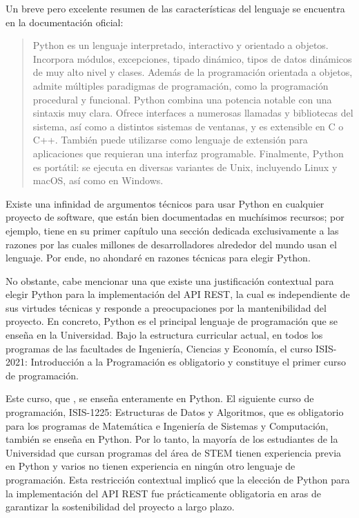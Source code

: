 Un breve pero excelente resumen de las características del lenguaje se encuentra en la documentación oficial:
\begin{quote}
	\gls{Python} es un lenguaje interpretado, interactivo y orientado a objetos. Incorpora módulos, excepciones, tipado dinámico, tipos de datos dinámicos de muy alto nivel y clases. Además de la programación orientada a objetos, admite múltiples paradigmas de programación, como la programación procedural y funcional. \gls{Python} combina una potencia notable con una sintaxis muy clara. Ofrece interfaces a numerosas llamadas y bibliotecas del sistema, así como a distintos sistemas de ventanas, y es extensible en C o C++. También puede utilizarse como lenguaje de extensión para aplicaciones que requieran una interfaz programable. Finalmente, \gls{Python} es portátil: se ejecuta en diversas variantes de Unix, incluyendo Linux y macOS, así como en Windows. \cite{python_official_docs}
\end{quote} %
\noindent Existe una infinidad de argumentos técnicos para usar \gls{Python} en cualquier proyecto de software, que están bien documentadas en muchísimos recursos; por ejemplo, \cite{learning_python} tiene en su primer capítulo una sección dedicada exclusivamente a las razones por las cuales millones de desarrolladores alrededor del mundo usan el lenguaje. Por ende, no ahondaré en razones técnicas para elegir \gls{Python}.

No obstante, cabe mencionar una que existe una justificación contextual para elegir \gls{Python} para la implementación del \gls{API REST}, la cual es independiente de sus virtudes técnicas y responde a preocupaciones por la mantenibilidad del proyecto. En concreto, \gls{Python} es el principal lenguaje de programación que se enseña en la Universidad. Bajo la estructura curricular actual, en todos los programas de las facultades de Ingeniería, Ciencias y Economía, el curso ISIS-2021: Introducción a la Programación es obligatorio y constituye el primer curso de programación. %

Este curso, que  \cite{ip}, se enseña enteramente en \gls{Python}. El siguiente curso de programación, ISIS-1225: Estructuras de Datos y Algoritmos, que es obligatorio para los programas de Matemática e Ingeniería de Sistemas y Computación, también se enseña en \gls{Python}. %
Por lo tanto, la mayoría de los estudiantes de la Universidad que cursan programas del área de STEM tienen experiencia previa en \gls{Python} y varios no tienen experiencia en ningún otro lenguaje de programación. Esta restricción contextual implicó que la elección de \gls{Python} para la implementación del \gls{API REST} fue prácticamente obligatoria en aras de garantizar la sostenibilidad del proyecto a largo plazo.

